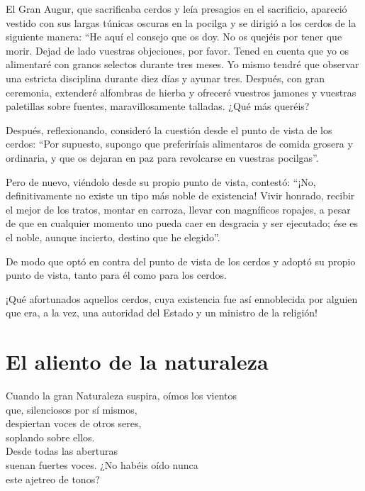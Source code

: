 \documentclass[hidelinks]{memoir}
\begin{document}
	El Gran Augur, que sacrificaba cerdos y leía presagios en el sacrificio,
	apareció vestido con sus largas túnicas oscuras en la pocilga y se
	dirigió a los cerdos de la siguiente manera: ``He aquí el consejo que os
	doy. No os quejéis por tener que morir. Dejad de lado vuestras
	objeciones, por favor. Tened en cuenta que yo os alimentaré con granos
	selectos durante tres meses. Yo mismo tendré que observar una estricta
	disciplina durante diez días y ayunar tres. Después, con gran ceremonia,
	extenderé alfombras de hierba y ofreceré vuestros jamones y vuestras
	paletillas sobre fuentes, maravillosamente talladas. ¿Qué más queréis?
	
	Después, reflexionando, consideró la cuestión desde el punto de vista de
	los cerdos: ``Por supuesto, supongo que preferiríais alimentaros de
	comida grosera y ordinaria, y que os dejaran en paz para revolcarse en
	vuestras pocilgas''.
	
	Pero de nuevo, viéndolo desde su propio punto de vista, contestó: ``¡No,
	definitivamente no existe un tipo más noble de existencia! Vivir
	honrado, recibir el mejor de los tratos, montar en carroza, llevar con
	magníficos ropajes, a pesar de que en cualquier momento uno pueda caer
	en desgracia y ser ejecutado; ése es el noble, aunque incierto, destino
	que he elegido''.
	
	De modo que optó en contra del punto de vista de los cerdos y adoptó su
	propio punto de vista, tanto para él como para los cerdos.
	
	¡Qué afortunados aquellos cerdos, cuya existencia fue así ennoblecida
	por alguien que era, a la vez, una autoridad del Estado y un ministro de
	la religión!
	
	\chapter*{El aliento de la naturaleza}
	
	Cuando la gran Naturaleza suspira, oímos los vientos\\
	que, silenciosos por sí mismos,\\
	despiertan voces de otros seres,\\
	soplando sobre ellos.\\
	Desde todas las aberturas\\
	suenan fuertes voces. ¿No habéis oído nunca\\
	este ajetreo de tonos?
	
\end{document}
